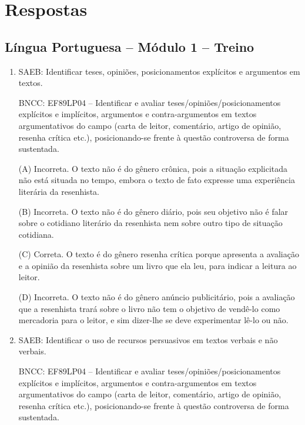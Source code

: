 \chapter{Respostas}
\pagestyle{plain}
\footnotesize

\pagecolor{gray!40}

\section*{Língua Portuguesa – Módulo 1 – Treino}

\begin{enumerate}
\item

SAEB: Identificar teses, opiniões, posicionamentos explícitos e
argumentos em textos.

BNCC: EF89LP04 -- Identificar e avaliar
teses/opiniões/posicionamentos explícitos e implícitos, argumentos e
contra-argumentos em textos argumentativos do campo (carta de leitor,
comentário, artigo de opinião, resenha crítica etc.), posicionando-se
frente à questão controversa de forma sustentada.

(A) Incorreta. O texto não é do gênero crônica, pois a situação
explicitada não está situada no tempo, embora o texto de fato expresse
uma experiência literária da resenhista. 

(B) Incorreta. O texto não é do
gênero diário, pois seu objetivo não é falar sobre o cotidiano literário
da resenhista nem sobre outro tipo de situação cotidiana. 

(C) Correta. O
texto é do gênero resenha crítica porque apresenta a avaliação e a
opinião da resenhista sobre um livro que ela leu, para indicar a leitura
ao leitor. 

(D) Incorreta. O texto não é do gênero anúncio publicitário,
pois a avaliação que a resenhista trará sobre o livro não tem o objetivo
de vendê-lo como mercadoria para o leitor, e sim dizer-lhe se deve
experimentar lê-lo ou não.

\item
SAEB: Identificar o uso de recursos persuasivos em textos verbais e não
verbais. 

BNCC: EF89LP04 -- Identificar e avaliar
teses/opiniões/posicionamentos explícitos e implícitos, argumentos e
contra-argumentos em textos argumentativos do campo (carta de leitor,
comentário, artigo de opinião, resenha crítica etc.), posicionando-se
frente à questão controversa de forma sustentada.


\end{enumerate}
